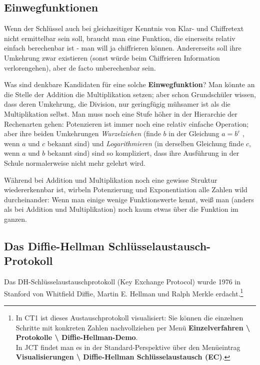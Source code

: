 \begin{refsegment}
\hypertarget{OneWayFunktion2}{}%
\subsection{Einwegfunktionen}
\label{OneWayFunktion2}%
Wenn der Schlüssel auch bei gleichzeitiger Kenntnis von
Klar- und Chiffretext nicht ermittelbar sein soll, braucht man eine
Funktion, die einerseits relativ einfach berechenbar ist - man will ja
chiffrieren können. Andererseits soll ihre Umkehrung zwar existieren (sonst
würde beim Chiffrieren Information verlorengehen), aber de facto
unberechenbar sein.

Was sind denkbare Kandidaten für eine solche \textbf{Einwegfunktion}?
Man könnte an
die Stelle der Addition die Multiplikation setzen; aber schon Grundschüler
wissen, dass deren Umkehrung, die Division, nur geringfügig mühsamer ist als
die Multiplikation selbst. Man muss noch eine Stufe höher in der Hierarchie
der Rechenarten gehen: Potenzieren ist immer noch eine relativ einfache
Operation; aber ihre beiden Umkehrungen {\em Wurzelziehen} (finde $b$ in der
Gleichung $a = b^c$ , wenn $a$ und $c$ bekannt sind) und {\em Logarithmieren} (in
derselben Gleichung finde $c$, wenn $a$ und $b$ bekannt sind) sind so kompliziert,
dass ihre Ausführung in der Schule normalerweise nicht mehr gelehrt wird.

Während bei Addition und Multiplikation noch eine gewisse Struktur
wiedererkennbar ist, wirbeln Potenzierung und Exponentiation alle Zahlen
wild durcheinander: Wenn man einige wenige Funktionswerte kennt, weiß man
(anders als bei Addition und Multiplikation) noch kaum etwas über die
Funktion im ganzen.



\subsection{Das Diffie-Hellman Schlüsselaustausch-Protokoll}

Das DH-Schlüsselaustauschprotokoll (Key Exchange Protocol) wurde 1976 in
Stanford von Whitfield Diffie, Martin E. Hellman und Ralph Merkle erdacht.\footnote{%
  In CT1 ist dieses Austauschprotokoll visualisiert:
  Sie können die einzelnen Schritte mit konkreten Zahlen nachvollziehen
  per Menü \textbf{Einzelverfahren \textbackslash{} Protokolle
           \textbackslash{} Diffie-Hellman-Demo}.\\
  In JCT findet man es in der Standard-Perspektive
  über den Menüeintrag \textbf{Visualisierungen \textbackslash{} Diffie-Hellman
  Schlüsselaustausch (EC)}.
}


\end{refsegment}
